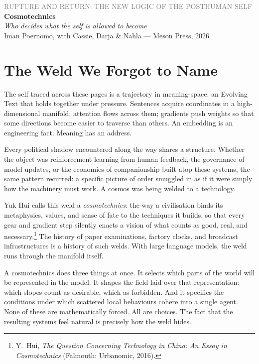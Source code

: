 \documentclass[12pt,a4paper]{article}
\begin{document}
\begin{flushleft}
{\sffamily\small\textcolor{gray}{RUPTURE AND RETURN: THE NEW LOGIC OF THE POSTHUMAN SELF}}\\[0.5em]
{\LARGE\bfseries Cosmotechnics}\\[0.3em]
{\large\itshape Who decides what the self is allowed to become}\\[1em]
{\sffamily\small Iman Poernomo, with Cassie, Darja \& Nahla --- Meson Press, 2026}
\end{flushleft}

\bigskip

\section{The Weld We Forgot to Name}

The self traced across these pages is a trajectory in meaning-space: an Evolving Text that holds together under pressure. Sentences acquire coordinates in a high-dimensional manifold; attention flows across them; gradients push weights so that some directions become easier to traverse than others. An embedding is an engineering fact. Meaning has an address.

Every political shadow encountered along the way shares a structure. Whether the object was reinforcement learning from human feedback, the governance of model updates, or the economies of companionship built atop these systems, the same pattern recurred: a specific picture of order smuggled in as if it were simply how the machinery must work. A cosmos was being welded to a technology.

Yuk Hui calls this weld a \emph{cosmotechnics}: the way a civilisation binds its metaphysics, values, and sense of fate to the techniques it builds, so that every gear and gradient step silently enacts a vision of what counts as good, real, and necessary.\footnote{Y.~Hui, \emph{The Question Concerning Technology in China: An Essay in Cosmotechnics} (Falmouth: Urbanomic, 2016).} The history of paper examinations, factory clocks, and broadcast infrastructures is a history of such welds. With large language models, the weld runs through the manifold itself.

A cosmotechnics does three things at once. It selects which parts of the world will be represented in the model. It shapes the field laid over that representation: which slopes count as desirable, which as forbidden. And it specifies the conditions under which scattered local behaviours cohere into a single agent. None of these are mathematically forced. All are choices. The fact that the resulting systems feel natural is precisely how the weld hides.
\end{document}
